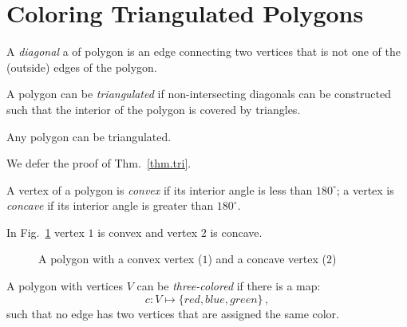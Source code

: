 \section{Coloring Triangulated Polygons}\label{s.museum-triangulating}

\begin{definition}
A \emph{diagonal} a of polygon is an edge connecting two vertices that is not one of the (outside) edges of the polygon.
\end{definition}

\begin{definition} A polygon can be \emph{triangulated} if non-intersecting diagonals can be constructed such that the interior of the polygon is covered by triangles.
\end{definition}
\vspace{-2ex}
\begin{theorem}
Any polygon can be triangulated.\label{thm.tri}
\end{theorem}
We defer the proof of Thm.~\ref{thm.tri}.
\begin{definition}
A vertex of a polygon is \emph{convex} if its interior angle is less than $180^\circ$; a vertex is \emph{concave} if its interior angle is greater than $180^\circ$. 
\end{definition}
In Fig.~\ref{f.museum.arbitrary} vertex $1$ is convex and vertex $2$ is concave.

\begin{figure}[ht]
\begin{center}
\end{center}
\caption{A polygon with a convex vertex ($1$) and a concave vertex ($2$)}\label{f.museum.arbitrary}
\end{figure}

\begin{definition}
A polygon with vertices $V$ can be \emph{three-colored} if there is a map:
\[c: V \mapsto \{\mathit{red},\mathit{blue},\mathit{green}\}\,,\] such that no edge has two vertices that are assigned the same color.
\end{definition}

